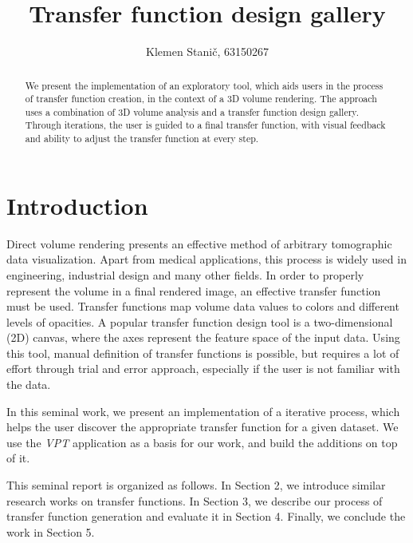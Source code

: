 \documentclass{egpubl-eurovis-short}
\title[Transfer function design gallery]%
      {Transfer function design gallery}
\author[Klemen Stanič, 63150267]{Klemen Stanič, 63150267}
\begin{document}

\maketitle

\begin{abstract}
We present the implementation of an exploratory tool, which aids users in the process of transfer function creation, in the context of a 3D volume rendering. The approach uses a combination of 3D volume analysis and a transfer function design gallery. Through iterations, the user is guided to a final transfer function, with visual feedback and ability to adjust the transfer function at every step.
\end{abstract}





\section{Introduction}
Direct volume rendering presents an effective method of arbitrary tomographic data visualization. Apart from medical applications, this process is widely used in engineering, industrial design and many other fields. In order to properly represent the volume in a final rendered image, an effective transfer function must be used. Transfer functions map volume data values to colors and different levels of opacities. A popular transfer function design tool is a two-dimensional (2D) canvas, where the axes represent the feature space of the input data. Using this tool, manual definition of transfer functions is possible, but requires a lot of effort through trial and error approach, especially if the user is not familiar with the data. 

In this seminal work, we present an implementation of a iterative process, which helps the user discover the appropriate transfer function for a given dataset. We use the \textit{VPT} application as a basis for our work, and build the additions on top of it. 

This seminal report is organized as follows. In Section 2, we introduce similar research works on transfer functions. In Section 3, we describe our process of transfer function generation and evaluate it in Section 4. Finally, we conclude the work in Section 5.
\end{document}

